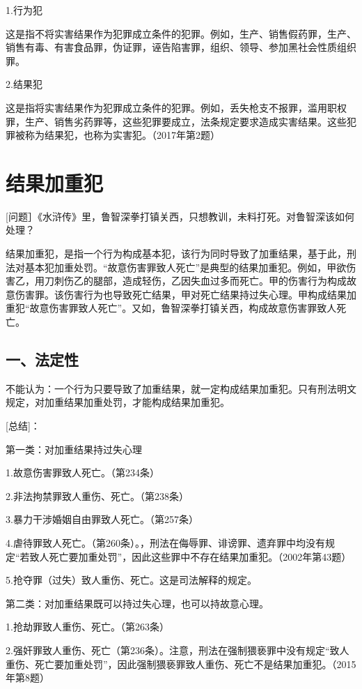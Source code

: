 1.行为犯

这是指不将实害结果作为犯罪成立条件的犯罪。例如，生产、销售假药罪，生产、销售有毒、有害食品罪，伪证罪，诬告陷害罪，组织、领导、参加黑社会性质组织罪。

2.结果犯

这是指将实害结果作为犯罪成立条件的犯罪。例如，丢失枪支不报罪，滥用职权罪，生产、销售劣药罪等，这些犯罪要成立，法条规定要求造成实害结果。这些犯罪被称为结果犯，也称为实害犯。（2017年第2题）

\section{结果加重犯}

[问题］《水浒传》里，鲁智深拳打镇关西，只想教训，未料打死。对鲁智深该如何处理？


结果加重犯，是指一个行为构成基本犯，该行为同时导致了加重结果，基于此，刑法对基本犯加重处罚。“故意伤害罪致人死亡”是典型的结果加重犯。例如，甲欲伤害乙，用刀刺伤乙的腿部，造成轻伤，乙因失血过多而死亡。甲的伤害行为构成故意伤害罪。该伤害行为也导致死亡结果，甲对死亡结果持过失心理。甲构成结果加重犯“故意伤害罪致人死亡”。又如，鲁智深拳打镇关西，构成故意伤害罪致人死亡。

\subsection*{一、法定性}

不能认为：一个行为只要导致了加重结果，就一定构成结果加重犯。只有刑法明文规定，对加重结果加重处罚，才能构成结果加重犯。

[总结]：

第一类：对加重结果持过失心理

1.故意伤害罪致人死亡。（第234条）

2.非法拘禁罪致人重伤、死亡。（第238条）

3.暴力干涉婚姻自由罪致人死亡。（第257条）

4.虐待罪致人死亡。（第260条）。，刑法在侮辱罪、诽谤罪、遗弃罪中均没有规定“若致人死亡要加重处罚”，因此这些罪中不存在结果加重犯。（2002年第43题）

5.抢夺罪（过失）致人重伤、死亡。这是司法解释的规定。

第二类：对加重结果既可以持过失心理，也可以持故意心理。

1.抢劫罪致人重伤、死亡。（第263条）

2.强奸罪致人重伤、死亡（第236条）。注意，刑法在强制猥亵罪中没有规定“致人重伤、死亡要加重处罚”，因此强制猥亵罪致人重伤、死亡不是结果加重犯。（2015年第8题）

